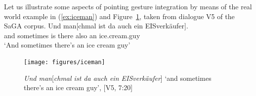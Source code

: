 \documentclass[output=paper,biblatex,babelshorthands,newtxmath,draftmode,colorlinks,citecolor=brown]{langscibook}
\begin{document}
Let us illustrate some aspects of pointing gesture integration by means of the real world example in (\ref{ex:iceman}) and Figure~\ref{fig:iceman}, taken from dialogue V5 of the SaGA corpus. %
%
\ea \label{ex:iceman}
\gll Und man[chmal ist da auch ein {EISverkäufer}]. \\
     and sometimes is there also an ice.cream.guy \\
\glt \enquote*{And sometimes there's an ice cream guy}
\z 

\begin{figure}[tb]
  \centering
  \texttt{[image: figures/iceman]}
  \caption[Ice cream guy]{\textit{Und man}[\textit{chmal ist da auch ein EISverkäufer}] \enquote*{and sometimes there's an ice cream guy}, [V5, 7:20]}
  \label{fig:iceman}
\end{figure}
\end{document}
